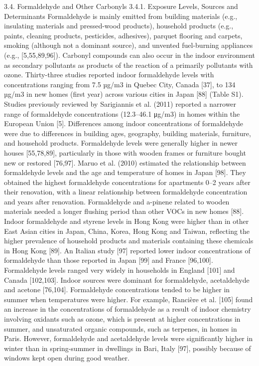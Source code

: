 3.4. Formaldehyde and Other Carbonyls
3.4.1. Exposure Levels, Sources and Determinants
Formaldehyde is mainly emitted from building materials (e.g., insulating materials and pressed-wood products), household products (e.g., paints, cleaning products, pesticides, adhesives), parquet flooring and carpets, smoking (although not a dominant source), and unvented fuel-burning appliances (e.g., [5,55,89,96]). Carbonyl compounds can also occur in the indoor environment as secondary pollutants as products of the reaction of a primarily pollutants with ozone.
Thirty-three studies reported indoor formaldehyde levels with concentrations ranging from 7.5 µg/m3 in Quebec City, Canada [37], to 134 µg/m3 in new homes (first year) across various cities in Japan [88] (Table S1). Studies previously reviewed by Sarigiannis et al. (2011) reported a narrower range of formaldehyde concentrations (12.3–46.1 μg/m3) in homes within the European Union [5]. Differences among indoor concentrations of formaldehyde were due to differences in building ages, geography, building materials, furniture, and household products. Formaldehyde levels were generally higher in newer houses [55,78,89], particularly in those with wooden frames or furniture bought new or restored [76,97]. Maruo et al. (2010) estimated the relationship between formaldehyde levels and the age and temperature of homes in Japan [98]. They obtained the highest formaldehyde concentrations for apartments 0–2 years after their renovation, with a linear relationship between formaldehyde concentration and years after renovation. Formaldehyde and a-pinene related to wooden materials needed a longer flushing period than other VOCs in new homes [88].
Indoor formaldehyde and styrene levels in Hong Kong were higher than in other East Asian cities in Japan, China, Korea, Hong Kong and Taiwan, reflecting the higher prevalence of household products and materials containing these chemicals in Hong Kong [89]. An Italian study [97] reported lower indoor concentrations of formaldehyde than those reported in Japan [99] and France [96,100]. Formaldehyde levels ranged very widely in households in England [101] and Canada [102,103].
Indoor sources were dominant for formaldehyde, acetaldehyde and acetone [76,104]. Formaldehyde concentrations tended to be higher in summer when temperatures were higher. For example, Rancière et al. [105] found an increase in the concentrations of formaldehyde as a result of indoor chemistry involving oxidants such as ozone, which is present at higher concentrations in summer, and unsaturated organic compounds, such as terpenes, in homes in Paris. However, formaldehyde and acetaldehyde levels were significantly higher in winter than in spring-summer in dwellings in Bari, Italy [97], possibly because of windows kept open during good weather.
